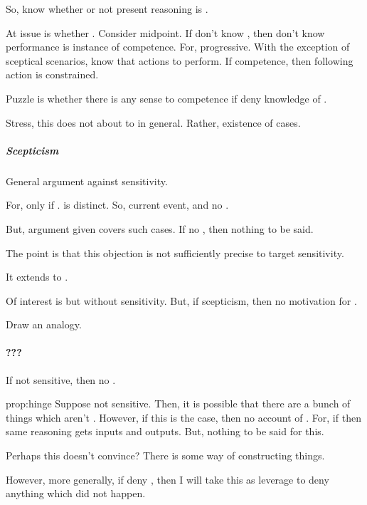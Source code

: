 \begin{note}
  So, know whether or not present reasoning is \sR{}.

  At issue is whether \fc{}.
  Consider midpoint.
  If don't know \fc{}, then don't know performance is instance of competence.
  For, progressive.
  With the exception of sceptical scenarios, know that actions to perform.
  If competence, then following action is constrained.
\end{note}

\begin{note}
  Puzzle is whether there is any sense to competence if deny knowledge of \fc{}.
\end{note}

\begin{note}
  Stress, this does not about to  in general.
  Rather, existence of cases.
\end{note}

\subparagraph{Scepticism}

\begin{note}
  General argument against sensitivity.
\end{note}

\begin{note}
  For, \fc{} only if \pevent{}.
  \pevent{} is distinct.
  So, current event, and no \pevent{}.
\end{note}

\begin{note}
  But, argument given covers such cases.
  If no \fc{}, then nothing to be said.

  The point is that this objection is not sufficiently precise to target sensitivity.

  It extends to \sR{}.

  Of interest is \sR{} but without sensitivity.
  But, if scepticism, then no motivation for \sR{}.

  Draw an analogy.
\end{note}

\paragraph{???}

\begin{note}
  \begin{proposition}
    \label{prop:hinge}
    If not sensitive, then no \sR{}.
  \end{proposition}

  \begin{argument}{prop:hinge}
    Suppose not sensitive.
    Then, it is possible that there are a bunch of things which aren't .
    However, if this is the case, then no account of \sR{}.
    For, if \sR{} then same reasoning gets inputs and outputs.
    But, nothing to be said for this.
  \end{argument}

  Perhaps this doesn't convince?
  There is some way of constructing things.

  However, more generally, if deny \fc{}, then I will take this as leverage to deny anything which did not happen.
\end{note}

